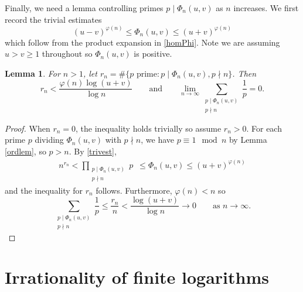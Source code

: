 \documentclass[12pt,reqno]{amsart}
\newtheorem{lemma}[theorem]{Lemma}
\theoremstyle{remark}
\begin{document}
Finally, we need a lemma controlling primes $p\mid\Phi_n(u,v)$ as $n$ increases. We first record the trivial estimates
\begin{equation}\label{trivest}
(u-v)^{\varphi(n)}\leq\Phi_n(u,v)\leq (u+v)^{\varphi(n)}
\end{equation}
which follow from the product expansion in \eqref{homPhi}. Note we are assuming $u>v\geq 1$ throughout so $\Phi_n(u,v)$ is positive.
\begin{lemma}\label{limlem}
For $n>1$, let $r_n=\#\{p\text{ prime} : p\mid\Phi_n(u,v), p\nmid n\}$. Then 
\[r_n<\frac{\varphi(n)\log(u+v)}{\log n}
\qquad\text{and}\qquad
\lim_{n\to\infty}\sum_{\substack{p\mid\Phi_n(u,v) \\ p\nmid n}}\frac{1}{p}=0.\]
\end{lemma}
\begin{proof}
When $r_n=0$, the inequality holds trivially so assume $r_n>0$. For each prime $p$ dividing $\Phi_n(u,v)$ with $p\nmid n$, 
we have $p\equiv 1\mod n$ by Lemma \ref{ordlem}, so $p>n$. By \eqref{trivest},
\begin{align*}
n^{r_n}<\prod_{\substack{p\mid\Phi_n(u,v) \\ p\nmid n}}\!\! p\;\ \leq \Phi_n(u,v)
\leq (u+v)^{\varphi(n)}
\end{align*}
and the inequality for $r_n$ follows. Furthermore, $\varphi(n)<n$ so
\[\sum_{\substack{p\mid\Phi_n(u,v) \\ p\nmid n}}\frac{1}{p}
\leq\frac{r_n}{n}
<\frac{\log(u+v)}{\log n}\longrightarrow 0\qquad\text{as $n\to\infty$.}\]
\vspace{-1cm}

\end{proof}


\section{Irrationality of finite logarithms}
\end{document}
